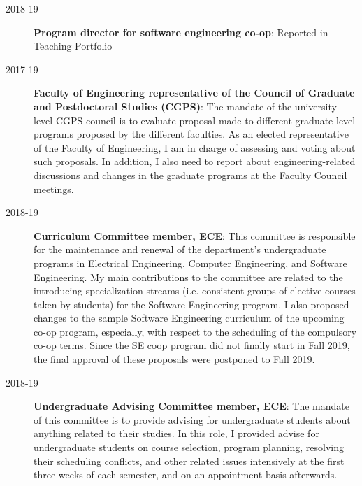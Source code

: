 \begin{description}
\item[2018-19] \textbf{Program director for software engineering co-op}: Reported in Teaching Portfolio
\item[2017-19] \textbf{Faculty of Engineering representative of the Council of Graduate and Postdoctoral Studies (CGPS)}: The mandate of the university-level CGPS council is to evaluate proposal made to different graduate-level programs proposed by the different faculties. As an elected representative of the Faculty of Engineering, I am in charge of assessing and voting about such proposals. In addition, I also need to report about engineering-related discussions and changes in the graduate programs at the Faculty Council meetings. 
\item[2018-19] \textbf{Curriculum Committee member, ECE}: 
This committee is responsible for the maintenance and renewal of the department’s undergraduate programs in Electrical Engineering, Computer Engineering, and Software Engineering. My main contributions to the committee are related to the introducing specialization streams (i.e. consistent groups of elective courses taken by students) for the Software Engineering program. I also proposed changes to the sample Software Engineering curriculum of the upcoming co-op program, especially, with respect to the scheduling of the compulsory co-op terms. Since the SE coop program did not finally start in Fall 2019, the final approval of these proposals were postponed to Fall 2019.

\item[2018-19] \textbf{Undergraduate Advising Committee member, ECE}: 
The mandate of this committee is to provide advising for undergraduate students about anything related to their studies. 
In this role, I provided advise for undergraduate students on course selection, program planning, resolving their scheduling conflicts, and other related issues intensively at the first three weeks of each semester, and on an appointment basis afterwards. 



\end{description}
